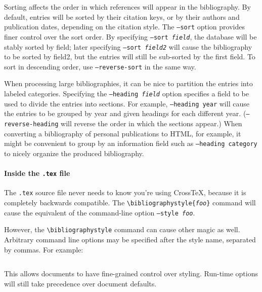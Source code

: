 \documentclass{article}
\newcommand{\XTeX}{Cross\TeX}
\begin{document}
Sorting affects the order in which references will appear in the bibliography.
By default, entries will be sorted by their citation keys, or by their
authors and publication dates, depending on the citation style. 
The \texttt{--sort} option provides
finer control over the sort order. By specifying \texttt{--sort
\textrm{\textit{field}}}, the database will be stably sorted by field;
later specifying \texttt{--sort \textrm{\textit{field2}}} will cause
the bibliography to be sorted by field2, but the entries will still be
sub-sorted by the first field. To sort in descending order, 
use \texttt{--reverse-sort} in the same way.

When processing large bibliographies, it can be nice to partition the entries into labeled categories. Specifying the \texttt{--heading \textrm{\textit{field}}} option specifies a field to be used to divide the entries into sections. For example, \texttt{--heading year} will cause the entries to be grouped by year and given headings for each different year. (\texttt{--reverse-heading} will reverse the order in which the sections appear.) When converting a bibliography of personal publications to HTML, for example, it might be convenient to group by an information field such as \texttt{--heading category} to nicely organize the produced bibliography.

\paragraph{Inside the \texttt{.tex} file}

The \texttt{.tex} source file never needs to know you're using \XTeX{}, because it is completely backwards compatible. The \texttt{\textbackslash{}bibliographystyle\{\textrm{\textit{foo}}\}} command will cause the equivalent of the command-line option \texttt{--style \textrm{\textit{foo}}}.

However, the \texttt{\textbackslash{}bibliographystyle} command can cause other magic as well. Arbitrary command line options may be specified after the style name, separated by commas. For example:

\begin{small}\begin{verbatim}

\end{verbatim}\end{small}

This allows documents to have fine-grained control over styling. Run-time options will still take precedence over document defaults.
\end{document}
